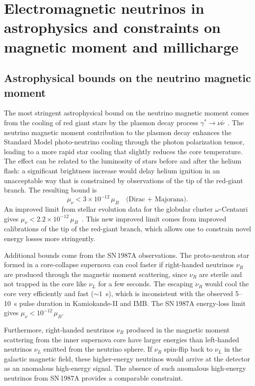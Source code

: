 \documentclass[a4paper,11pt]{article}
\begin{document}
\section{Electromagnetic neutrinos in astrophysics and constraints on magnetic moment and millicharge}
\label{sec:astro}

\subsection{Astrophysical bounds on the neutrino magnetic moment}

The most stringent astrophysical bound on the neutrino magnetic moment comes from the cooling of red giant stars by the plasmon decay process $\gamma^* \to \nu\bar{\nu}$~\cite{Raffelt:1990}. The neutrino magnetic moment contribution to the plasmon decay enhances the Standard Model photo-neutrino cooling through the photon polarization tensor, leading to a more rapid star cooling that slightly reduces the core temperature. The effect can be related to the luminosity of stars before and after the helium flash: a significant brightness increase would delay helium ignition in an unacceptable way that is constrained by observations of the tip of the red-giant branch. The resulting bound is~\cite{Raffelt:1990}
\begin{equation}
\mu_\nu < 3 \times 10^{-12}\,\mu_B \quad \text{(Dirac + Majorana)}.
\end{equation}
An improved limit from stellar evolution data for the globular cluster $\omega$-Centauri gives $\mu_\nu < 2.2 \times 10^{-12}\,\mu_B$~\cite{ArceoDiaz:2015}. This new improved limit comes from improved calibrations of the tip of the red-giant branch, which allows one to constrain novel energy losses more stringently.

Additional bounds come from the SN\,1987A observations. The proto-neutron star formed in a core-collapse supernova can cool faster if right-handed neutrinos $\nu_R$ are produced through the magnetic moment scattering, since $\nu_R$ are sterile and not trapped in the core like $\nu_L$ for a few seconds. The escaping $\nu_R$ would cool the core very efficiently and fast ($\sim 1$~s), which is inconsistent with the observed 5--10~s pulse duration in Kamiokande-II and IMB. The SN\,1987A energy-loss limit gives $\mu_\nu < 10^{-12}\,\mu_B$.

Furthermore, right-handed neutrinos $\nu_R$ produced in the magnetic moment scattering from the inner supernova core have larger energies than left-handed neutrinos $\nu_L$ emitted from the neutrino sphere. If $\nu_R$ spin-flip back to $\nu_L$ in the galactic magnetic field, these higher-energy neutrinos would arrive at the detector as an anomalous high-energy signal. The absence of such anomalous high-energy neutrinos from SN\,1987A provides a comparable constraint.
\end{document}
